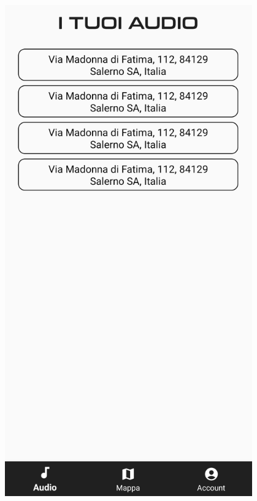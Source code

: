 \documentclass{article}
\begin{document}
\begin{minipage}[t]{0.35\textwidth}
    \centering
    \vspace*{0pt}
    \includegraphics[width=0.8\textwidth]{offlinelist.png}\vspace*{40pt}
\end{minipage}
\end{document}
